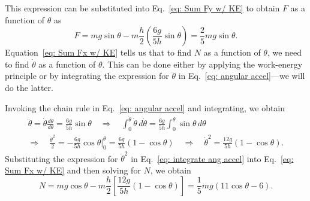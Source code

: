 This expression can be substituted into Eq.~\eqref{eq: Sum Fy w/ KE} to obtain $F$ as a function of $\theta$ as
\begin{equation}
\label{eq: F(theta)}
F = mg \sin\theta - m \frac{h}{2} \left( \frac{6g}{5h} \sin\theta \right) = \frac{2}{5} mg \sin\theta.
\end{equation}
Equation~\eqref{eq: Sum Fx w/ KE} tells us that to find $N$ as a function of $\theta$, we need to find $\dot{\theta}$ as a function of $\theta$. This can be done either by applying the work-energy principle or by integrating the expression for $\ddot{\theta}$ in Eq.~\eqref{eq: angular accel}---we will do the latter.

Invoking the chain rule in Eq.~\eqref{eq: angular accel} and integrating, we obtain
\begin{multline}
\label{eq: integrate ang accel}
\ddot{\theta} = \dot{\theta} \frac{d\dot{\theta}}{d\theta} = \frac{6g}{5h} \sin\theta
\quad \Rightarrow \quad
\int_0^{\dot{\theta}} \dot{\theta} \, d\dot{\theta} = \frac{6g}{5h} \int_0^\theta \sin\theta \,d\theta \\
\Rightarrow \quad
\frac{\dot{\theta}^2}{2} = -\frac{6g}{5h} \cos\theta \biggr|_0^\theta = \frac{6g}{5h} \left( 1 - \cos\theta \right)
\quad \Rightarrow \quad
\dot{\theta}^2 = \frac{12g}{5h} \left( 1 - \cos\theta \right).
\end{multline}
Substituting the expression for $\dot{\theta}^2$ in  Eq.~\eqref{eq: integrate ang accel} into Eq.~\eqref{eq: Sum Fx w/ KE} and then solving for $N$, we obtain
\begin{equation}
\label{eq: N(theta)}
N = mg \cos\theta - m \frac{h}{2} \left[ \frac{12g}{5h} \left( 1 - \cos\theta \right) \right] = \frac{1}{5} mg \left( 11 \cos\theta - 6 \right).
\end{equation}

